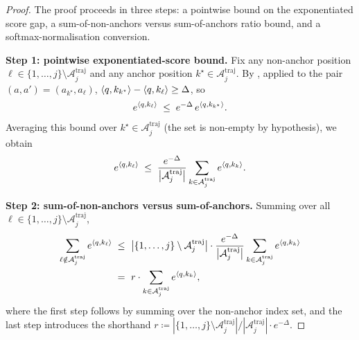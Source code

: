 \begin{proof}
The proof proceeds in three steps: a pointwise bound on the
exponentiated score gap, a sum-of-non-anchors versus sum-of-anchors
ratio bound, and a softmax-normalisation conversion.

\noindent\textbf{Step 1: pointwise exponentiated-score bound.}
Fix any non-anchor position
$\ell \in \{1, \dots, j\} \setminus \mathcal A^{\mathrm{traj}}_j$ and any
anchor position $k^\star \in \mathcal A^{\mathrm{traj}}_j$. By
, applied to the pair
$(a, a') = (a_{k^\star}, a_\ell)$,
$\left\langle q, k_{k^\star} \right\rangle - \left\langle q, k_\ell \right\rangle \ge \Delta$, so
\begin{align*}
   e^{\left\langle q, k_\ell \right\rangle}
   \;\le\;
   e^{-\Delta}\, e^{\left\langle q, k_{k^\star} \right\rangle}.
\end{align*}
Averaging this bound over $k^\star \in \mathcal A^{\mathrm{traj}}_j$
(the set is non-empty by hypothesis), we obtain
\begin{align}\label{eq:pointwise_non_anchor_bound}
   e^{\left\langle q, k_\ell \right\rangle}
   \;\le\;
   \frac{e^{-\Delta}}{\big|\mathcal A^{\mathrm{traj}}_j\big|}
   \sum_{k \in \mathcal A^{\mathrm{traj}}_j} e^{\left\langle q, k_k \right\rangle}.
\end{align}

\noindent\textbf{Step 2: sum-of-non-anchors versus sum-of-anchors.}
Summing  over all
$\ell \in \{1, \dots, j\} \setminus \mathcal A^{\mathrm{traj}}_j$,
\begin{align*}
   \sum_{\ell \notin \mathcal A^{\mathrm{traj}}_j} e^{\left\langle q, k_\ell \right\rangle}
   \;\le\; & ~
   \big|\{1, \dots, j\} \setminus \mathcal A^{\mathrm{traj}}_j\big| \cdot
   \frac{e^{-\Delta}}{\big|\mathcal A^{\mathrm{traj}}_j\big|}
   \sum_{k \in \mathcal A^{\mathrm{traj}}_j} e^{\left\langle q, k_k \right\rangle} \\
   \;=\; & ~ r \cdot \sum_{k \in \mathcal A^{\mathrm{traj}}_j} e^{\left\langle q, k_k \right\rangle},
\end{align*}
where the first step follows by summing
 over the non-anchor index set, and
the last step introduces the shorthand
$r \coloneqq |\{1, \dots, j\} \setminus \mathcal A^{\mathrm{traj}}_j| / |\mathcal A^{\mathrm{traj}}_j| \cdot e^{-\Delta}$.


\end{proof}
